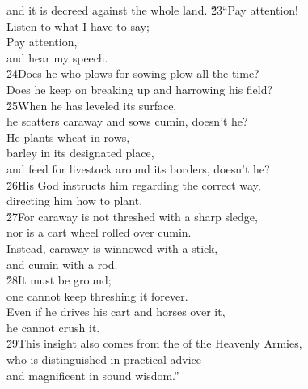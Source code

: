 \begin{poetry}
\poemll    and it is decreed against the whole land.
\poeml \v{23}``Pay attention! \\
\poemll    Listen to what I have to say; \\
\poeml Pay attention, \\
\poemll    and hear my speech. \\
\poeml \v{24}Does he who plows for sowing plow all the time? \\
\poemll    Does he keep on breaking up and harrowing his field? \\
\poeml \v{25}When he has leveled its surface, \\
\poemll    he scatters caraway and sows cumin, doesn't he? \\
\poeml He plants wheat in rows, \\
\poemll    barley in its designated place, \\
\poeml and feed for livestock around its borders, doesn't he? \\
\poeml \v{26}His God instructs him regarding the correct way, \\
\poemll    directing him how to plant. \\
\poeml \v{27}For caraway is not threshed with a sharp sledge, \\
\poemll    nor is a cart wheel rolled over cumin. \\
\poeml Instead, caraway is winnowed with a stick, \\
\poemll    and cumin with a rod. \\
\poeml \v{28}It must be ground; \\
\poemll    one cannot keep threshing it forever. \\
\poeml Even if he drives his cart and horses over it, \\
\poemll    he cannot crush it. \\
\poeml \v{29}This insight also comes from the  of the Heavenly Armies, \\
\poemll    who is distinguished in practical advice \\
\poemlll       and magnificent in sound wisdom.''
\end{poetry}

